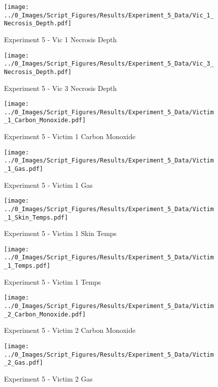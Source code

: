 	\begin{figure}[H]
		\centering
		\texttt{[image: ../0\_Images/Script\_Figures/Results/Experiment\_5\_Data/Vic\_1\_Necrosis\_Depth.pdf]}
		\caption[]{Experiment 5 - Vic 1 Necrosis Depth}
	\end{figure}
 
	\clearpage

	\begin{figure}[H]
		\centering
		\texttt{[image: ../0\_Images/Script\_Figures/Results/Experiment\_5\_Data/Vic\_3\_Necrosis\_Depth.pdf]}
		\caption[]{Experiment 5 - Vic 3 Necrosis Depth}
	\end{figure}
 

	\begin{figure}[H]
		\centering
		\texttt{[image: ../0\_Images/Script\_Figures/Results/Experiment\_5\_Data/Victim\_1\_Carbon\_Monoxide.pdf]}
		\caption[]{Experiment 5 - Victim 1 Carbon Monoxide}
	\end{figure}
 
	\clearpage

	\begin{figure}[H]
		\centering
		\texttt{[image: ../0\_Images/Script\_Figures/Results/Experiment\_5\_Data/Victim\_1\_Gas.pdf]}
		\caption[]{Experiment 5 - Victim 1 Gas}
	\end{figure}
 

	\begin{figure}[H]
		\centering
		\texttt{[image: ../0\_Images/Script\_Figures/Results/Experiment\_5\_Data/Victim\_1\_Skin\_Temps.pdf]}
		\caption[]{Experiment 5 - Victim 1 Skin Temps}
	\end{figure}
 
	\clearpage

	\begin{figure}[H]
		\centering
		\texttt{[image: ../0\_Images/Script\_Figures/Results/Experiment\_5\_Data/Victim\_1\_Temps.pdf]}
		\caption[]{Experiment 5 - Victim 1 Temps}
	\end{figure}
 

	\begin{figure}[H]
		\centering
		\texttt{[image: ../0\_Images/Script\_Figures/Results/Experiment\_5\_Data/Victim\_2\_Carbon\_Monoxide.pdf]}
		\caption[]{Experiment 5 - Victim 2 Carbon Monoxide}
	\end{figure}
 
	\clearpage

	\begin{figure}[H]
		\centering
		\texttt{[image: ../0\_Images/Script\_Figures/Results/Experiment\_5\_Data/Victim\_2\_Gas.pdf]}
		\caption[]{Experiment 5 - Victim 2 Gas}
	\end{figure}
 

